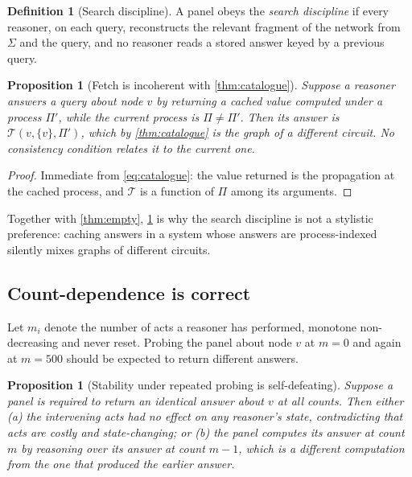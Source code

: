 \documentclass[11pt,twocolumn,a4paper]{article}
\theoremstyle{plain}
\newtheorem{proposition}[theorem]{Proposition}
\theoremstyle{definition}
\newtheorem{definition}[theorem]{Definition}
\theoremstyle{remark}
\newcommand{\Tmap}{\mathcal{T}}
\begin{document}
\begin{definition}[Search discipline]
\label{def:search}
A panel obeys the \emph{search discipline} if every reasoner, on each query,
reconstructs the relevant fragment of the network from $\Sigma$ and the query,
and no reasoner reads a stored answer keyed by a previous query.
\end{definition}

\begin{proposition}[Fetch is incoherent with \cref{thm:catalogue}]
\label{prop:fetch}
Suppose a reasoner answers a query about node $v$ by returning a cached value
computed under a process $\Pi'$, while the current process is $\Pi\ne\Pi'$.
Then its answer is $\Tmap(v,\{v\},\Pi')$, which by \cref{thm:catalogue} is the
graph of a different circuit. No consistency condition relates it to the current
one.
\end{proposition}

\begin{proof}
Immediate from \cref{eq:catalogue}: the value returned is the propagation at the
cached process, and $\Tmap$ is a function of $\Pi$ among its arguments.
\end{proof}

Together with \cref{thm:empty}, \cref{prop:fetch} is why the search discipline
is not a stylistic preference: caching answers in a system whose answers are
process-indexed silently mixes graphs of different circuits.

\subsection{Count-dependence is correct}
\label{sec:count}

Let $m_i$ denote the number of acts a reasoner has performed, monotone
non-decreasing and never reset. Probing the panel about node $v$ at $m=0$ and
again at $m=500$ should be expected to return different answers.

\begin{proposition}[Stability under repeated probing is self-defeating]
\label{prop:count}
Suppose a panel is required to return an identical answer about $v$ at all
counts. Then either (a) the intervening acts had no effect on any reasoner's
state, contradicting that acts are costly and state-changing; or (b) the panel
computes its answer at count $m$ by reasoning over its answer at count $m-1$,
which is a different computation from the one that produced the earlier answer.
\end{proposition}
\end{document}
